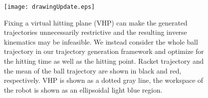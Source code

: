 \begin{figure}[t!]
\centering
\texttt{[image: drawingUpdate.eps]}			
\caption{Fixing a virtual hitting plane (VHP) can make the generated trajectories unnecessarily restrictive and the resulting inverse kinematics may be infeasible. We instead consider the whole ball trajectory in our trajectory generation framework and optimize for the hitting time as well as the hitting point. Racket trajectory and the mean of the ball trajectory are shown in black and red, respectively. VHP is shown as a dotted gray line, the workspace of the robot is shown as an ellipsoidal light blue region.}
\label{mainIdea}
\end{figure}